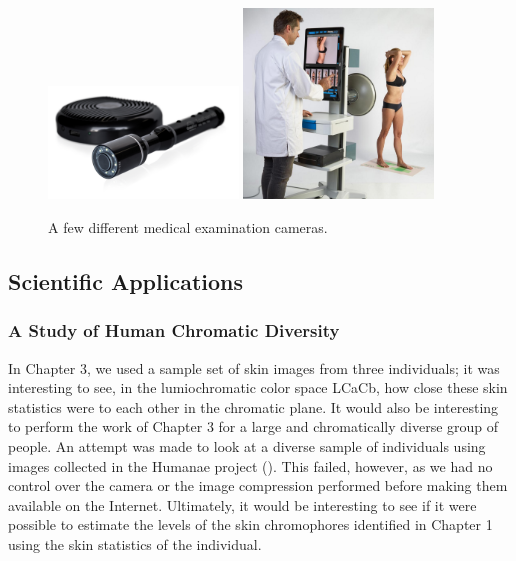 \begin{figure}[h!]
  \centering
    \includegraphics[width=0.45\textwidth]{Chapter5/Figs/TEHD_1.png}
    \includegraphics[width=0.45\textwidth]{Chapter5/Figs/examination-clinical-dermoscan-x2.jpg}
    \caption{A few different medical examination cameras. }\label{fig:MedicalExaminationCameras}
\end{figure}

\subsection{Scientific Applications}\label{sec:ScientificApplications}

\subsubsection{A Study of Human Chromatic Diversity}\label{sec:AStudyOfHumanChromaticDiversity}
In Chapter 3, we used a sample set of skin images from three individuals; it was interesting to see, in the lumiochromatic color space LCaCb, how close these skin statistics were to each other in the chromatic plane. It would also be interesting to perform the work of Chapter 3 for a large and chromatically diverse group of people. An attempt was made to look at a diverse sample of individuals using images collected in the Humanae project (\cite{dass2012}). This failed, however, as we had no control over the camera or the image compression performed before making them available on the Internet. Ultimately, it would be interesting to see if it were possible to estimate the levels of the skin chromophores identified in Chapter 1 using the skin statistics of the individual.

